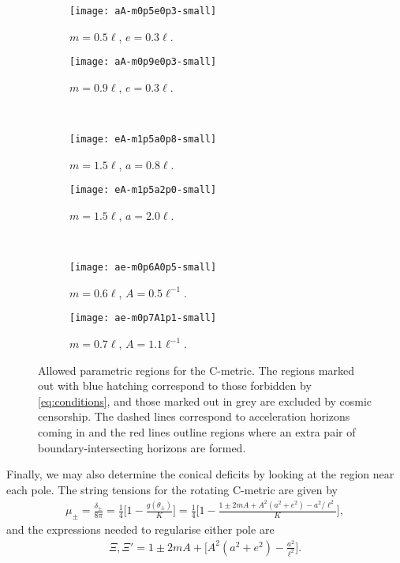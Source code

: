 \documentclass[
twoside,
openright,
frontopenright,
]{dmathesis}
\begin{document}
\begin{figure}
  \centering
  \begin{subfigure}[b]{0.45\textwidth}
    \texttt{[image: aA-m0p5e0p3-small]}
    \caption{\label{fig:aA-m0p5e0p3}$m=0.5\ell$, $e=0.3\ell$.}
  \end{subfigure}\qquad
  \begin{subfigure}[b]{0.45\textwidth}
    \texttt{[image: aA-m0p9e0p3-small]}
    \caption{\label{fig:aA-m0p9e0p3}$m=0.9\ell$, $e=0.3\ell$.}
  \end{subfigure} \\
  \begin{subfigure}[b]{0.45\textwidth}
    \texttt{[image: eA-m1p5a0p8-small]}
    \caption{\label{fig:eA-m1p5a0p8}$m=1.5\ell$, $a=0.8\ell$.}
  \end{subfigure}\qquad
  \begin{subfigure}[b]{0.45\textwidth}
    \texttt{[image: eA-m1p5a2p0-small]}
    \caption{\label{fig:eA-m1p5a2p0}$m=1.5\ell$, $a=2.0\ell$.}
  \end{subfigure} \\
  \begin{subfigure}[b]{0.45\textwidth}
    \texttt{[image: ae-m0p6A0p5-small]}
    \caption{\label{fig:ae-m0p6A0p5}$m=0.6\ell$, $A=0.5\ell^{-1}$.}
  \end{subfigure}\qquad
  \begin{subfigure}[b]{0.45\textwidth}
    \texttt{[image: ae-m0p7A1p1-small]}
    \caption{\label{fig:ae-m1p6A1p3}$m=0.7\ell$, $A=1.1\ell^{-1}$.}
  \end{subfigure}
  \caption{\label{fig:param-regions}Allowed parametric regions for the
    C-metric. The regions marked out with blue hatching correspond to those
    forbidden by \cref{eq:conditions}, and those marked out in grey are excluded
    by cosmic censorship. The dashed lines correspond to acceleration horizons
    coming in and the red lines outline regions where an extra pair of
    boundary-intersecting horizons are formed.}
\end{figure}

Finally, we may also determine the conical deficits by looking at the region
near each pole. The string tensions for the rotating C-metric are given by
\begin{align}
\mu_\pm = \frac{\delta_\pm}{8\pi}=\frac14\bigg[1-\frac{g(\theta_\pm)}{K}\bigg] =
  \frac14\bigg[1-\frac{1\pm 2mA + A^2(a^2+e^2)-a^2/\ell^2}{K}\bigg], 
\end{align}
and the expressions needed to regularise either pole are
\begin{align}
\Xi, \Xi' = 1\pm 2mA + \bigg[A^2(a^2+e^2)-\frac{a^2}{\ell^2}\bigg].
\end{align}
\end{document}
